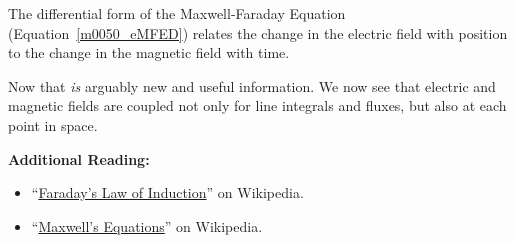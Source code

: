 \begin{mdframed}[backgroundcolor=yellow!20,nobreak=true] 
The differential form of the Maxwell-Faraday Equation (Equation~\ref{m0050_eMFED}) relates the change in the electric field with position to the change in the magnetic field with time.
\end{mdframed}

Now that \emph{is} arguably new and useful information.  We now see that electric and magnetic fields are coupled not only for line integrals and fluxes, but also at each point in space.  


{\bf Additional Reading:}
\begin{itemize}
\item ``\href{https://en.wikipedia.org/wiki/Faraday's_law_of_induction}{Faraday's Law of Induction}'' on Wikipedia.
\item ``\href{https://en.wikipedia.org/wiki/Maxwell's_equations}{Maxwell's Equations}'' on Wikipedia.
\end{itemize}



